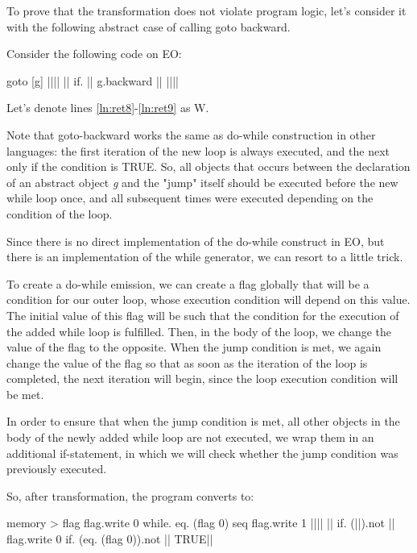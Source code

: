 \documentclass[sigplan,review,11pt,nonacm,natbib=false]{acmart}
\begin{document}
To prove that the transformation does not violate program logic, let's consider it with the following abstract case of calling goto backward.

Consider the following code on EO:

\begin{ffcode}
goto
  [g]
    |||$\label{ln:ret8}$|
      ||
      if.
        ||
        g.backward
        ||
      |||$\label{ln:ret9}$|
\end{ffcode}

Let's denote lines \ref{ln:ret8}-\ref{ln:ret9} as W.

Note that goto-backward works the same as do-while construction in other languages: the first iteration of the new loop is always executed, and the next only if the condition is TRUE.
So, all objects that occurs between the declaration of an abstract object \emph{g} and the "jump" itself should be executed before the new while loop once, and all subsequent times were executed depending on the condition of the loop.

Since there is no direct implementation of the do-while construct in EO, but there is an implementation of the while generator, we can resort to a little trick.

To create a do-while emission, we can create a flag globally that will be a condition for our outer loop, whose execution condition will depend on this value. The initial value of this flag will be such that the condition for the execution of the added while loop is fulfilled. Then, in the body of the loop, we change the value of the flag to the opposite. When the jump condition is met, we again change the value of the flag so that as soon as the iteration of the loop is completed, the next iteration will begin, since the loop execution condition will be met.

In order to ensure that when the jump condition is met, all other objects in the body of the newly added while loop are not executed, we wrap them in an additional if-statement, in which we will check whether the jump condition was previously executed.

So, after transformation, the program converts to:
\begin{ffcode}

memory > flag
flag.write 0
while.
  eq. (flag 0)
  seq
    flag.write 1
    |||$\label{ln:ret10}$|
      ||
      if.
        (||).not
        ||
        flag.write 0
      if.
        (eq. (flag 0)).not
        ||
        TRUE|$\label{ln:ret11}$|
    
\end{ffcode}
\end{document}
